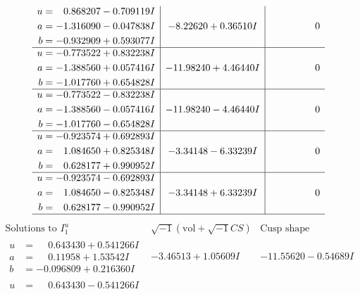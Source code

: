 \documentclass[1p]{elsarticle_modified}
\theoremstyle{definition}
\newcommand{\I}{\sqrt{-1}}
\begin{document}
$$\begin{array}{c|c|c}
\begin{aligned}
u &= \phantom{-}0.868207 - 0.709119 I \\
a &= -1.316090 - 0.047838 I \\
b &= -0.932909 + 0.593077 I\end{aligned}
 & -8.22620 + 0.36510 I & \phantom{-0.000000 } 0 \\ \hline\begin{aligned}
u &= -0.773522 + 0.832238 I \\
a &= -1.388560 + 0.057416 I \\
b &= -1.017760 + 0.654828 I\end{aligned}
 & -11.98240 + 4.46440 I & \phantom{-0.000000 } 0 \\ \hline\begin{aligned}
u &= -0.773522 - 0.832238 I \\
a &= -1.388560 - 0.057416 I \\
b &= -1.017760 - 0.654828 I\end{aligned}
 & -11.98240 - 4.46440 I & \phantom{-0.000000 } 0 \\ \hline\begin{aligned}
u &= -0.923574 + 0.692893 I \\
a &= \phantom{-}1.084650 + 0.825348 I \\
b &= \phantom{-}0.628177 + 0.990952 I\end{aligned}
 & -3.34148 - 6.33239 I & \phantom{-0.000000 } 0 \\ \hline\begin{aligned}
u &= -0.923574 - 0.692893 I \\
a &= \phantom{-}1.084650 - 0.825348 I \\
b &= \phantom{-}0.628177 - 0.990952 I\end{aligned}
 & -3.34148 + 6.33239 I & \phantom{-0.000000 } 0\\
 \hline 
 \end{array}$$\newpage$$\begin{array}{c|c|c}  
\text{Solutions to }I^u_{1}& \I (\text{vol} + \sqrt{-1}CS) & \text{Cusp shape}\\
 \hline 
\begin{aligned}
u &= \phantom{-}0.643430 + 0.541266 I \\
a &= \phantom{-}0.11958 + 1.53542 I \\
b &= -0.096809 + 0.216360 I\end{aligned}
 & -3.46513 + 1.05609 I & -11.55620 - 0.54689 I \\ \hline\begin{aligned}
u &= \phantom{-}0.643430 - 0.541266 I \\

\end{aligned}
\end{array}$$
\end{document}
